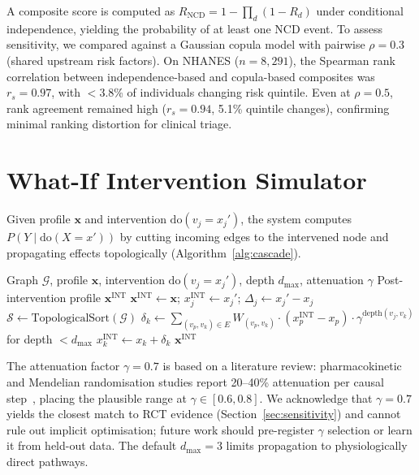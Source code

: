 \documentclass[runningheads]{llncs}
\begin{document}
A composite score is computed as
$R_{\mathrm{NCD}} = 1 - \prod_{d} (1 - R_d)$
under conditional independence, yielding the probability of at least
one NCD event.
To assess sensitivity, we compared against a Gaussian copula model
with pairwise $\rho = 0.3$ (shared upstream risk factors).
On NHANES ($n = 8{,}291$), the Spearman rank correlation between
independence-based and copula-based composites was $r_s = 0.97$,
with $<$3.8\% of individuals changing risk quintile.
Even at $\rho = 0.5$, rank agreement remained high
($r_s = 0.94$, 5.1\% quintile changes), confirming minimal
ranking distortion for clinical triage.

\section{What-If Intervention Simulator}\label{sec:whatif}

Given profile $\mathbf{x}$ and intervention
$\mathrm{do}(v_j = x_j')$, the system computes
$P(Y \mid \mathrm{do}(X = x'))$ by cutting incoming edges to the
intervened node and propagating effects topologically
(Algorithm~\ref{alg:cascade}).

\begin{algorithm}[t]
\caption{Topological Intervention Cascade}
\label{alg:cascade}
\begin{algorithmic}[1]
\REQUIRE Graph $\mathcal{G}$, profile $\mathbf{x}$, intervention
  $\mathrm{do}(v_j = x_j')$, depth $d_{\max}$, attenuation $\gamma$
\ENSURE Post-intervention profile $\mathbf{x}^{\mathrm{INT}}$
\STATE $\mathbf{x}^{\mathrm{INT}} \leftarrow \mathbf{x}$;
  $x_j^{\mathrm{INT}} \leftarrow x_j'$;
  $\Delta_j \leftarrow x_j' - x_j$
\STATE $\mathcal{S} \leftarrow \text{TopologicalSort}(\mathcal{G})$
  \STATE $\delta_k \leftarrow \sum_{(v_p, v_k) \in E} W_{(v_p,v_k)} \cdot (x_p^{\mathrm{INT}} - x_p) \cdot \gamma^{\text{depth}(v_j,v_k)}$ for depth $< d_{\max}$
  \STATE $x_k^{\mathrm{INT}} \leftarrow x_k + \delta_k$
\ENDFOR
\RETURN $\mathbf{x}^{\mathrm{INT}}$
\end{algorithmic}
\end{algorithm}

The attenuation factor $\gamma = 0.7$ is based on a literature review:
pharmacokinetic and Mendelian randomisation studies report 20--40\%
attenuation per causal step~\cite{ctt2010,pearl2009causality},
placing the plausible range at $\gamma \in [0.6, 0.8]$.
We acknowledge that $\gamma = 0.7$ yields the closest match to RCT
evidence (Section~\ref{sec:sensitivity}) and cannot rule out
implicit optimisation; future work should pre-register $\gamma$
selection or learn it from held-out data.
The default $d_{\max} = 3$ limits propagation to physiologically
direct pathways.
\end{document}

